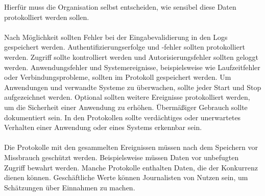 Hierfür muss die Organisation selbst entscheiden, wie sensibel diese Daten protokolliert werden sollen.
\\
\\
Nach Möglichkeit sollten Fehler bei der Eingabevalidierung in den Logs gespeichert werden.
Authentifizierungserfolge und -fehler sollten protokolliert werden.
Zugriff sollte kontrolliert werden und Autorisierungsfehler sollten geloggt werden.
Anwendungsfehler und Systemereignisse, beispielsweise wie Laufzeitfehler oder Verbindungsprobleme, sollten im Protokoll gespeichert werden.
Um Anwendungen und verwandte Systeme zu überwachen, sollte jeder Start und Stop aufgezeichnet werden.
Optional sollten weitere Ereignisse protokolliert werden, um die Sicherheit einer Anwendung zu erhöhen.
Übermäßiger Gebrauch sollte dokumentiert sein.
In den Protokollen sollte verdächtiges oder unerwartetes Verhalten einer Anwendung oder eines Systems erkennbar sein.
\\
\\
Die Protokolle mit den gesammelten Ereignissen müssen nach dem Speichern vor Missbrauch geschützt werden.
Beispielsweise müssen Daten vor unbefugten Zugriff bewahrt werden.
Manche Protokolle enthalten Daten, die der Konkurrenz dienen können.
Geschäftliche Werte können Journalisten von Nutzen sein, um Schätzungen über Einnahmen zu machen.\autocite{ip-insider, ait, owasp}



